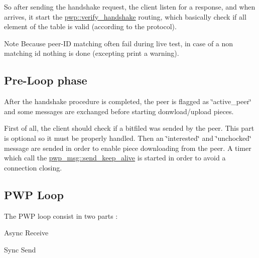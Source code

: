 So after sending the handshake request, the client listen for a response, and when arrives, it start the \hyperlink{namespacepwp_a58c780495f2139a56b95662dc7c0345f}{pwp\+::verify\+\_\+handshake} routing, which basically check if all element of the table is valid (according to the protocol).

\begin{DoxyNote}{Note}
Because peer-\/\+ID matching often fail during live test, in case of a non matching id nothing is done (excepting print a warning).
\end{DoxyNote}
\subsection*{Pre-\/\+Loop phase }

After the handshake procedure is completed, the peer is flagged as \char`\"{}active\+\_\+peer\char`\"{} and some messages are exchanged before starting donwload/upload pieces.

First of all, the client should check if a bitfiled was sended by the peer. This part is optional so it must be properly handled. Then an \char`\"{}interested\char`\"{} and \char`\"{}unchocked\char`\"{} message are sended in order to enable piece downloading from the peer. A timer which call the \hyperlink{namespacepwp__msg_a9a577f5a53b823d83bb4694f1ebf141e}{pwp\+\_\+msg\+::send\+\_\+keep\+\_\+alive} is started in order to avoid a connection closing.

\subsection*{P\+WP Loop }

The P\+WP loop consist in two parts \+:
\begin{DoxyItemize}
\item Async Receive
\item Sync Send
\end{DoxyItemize}

